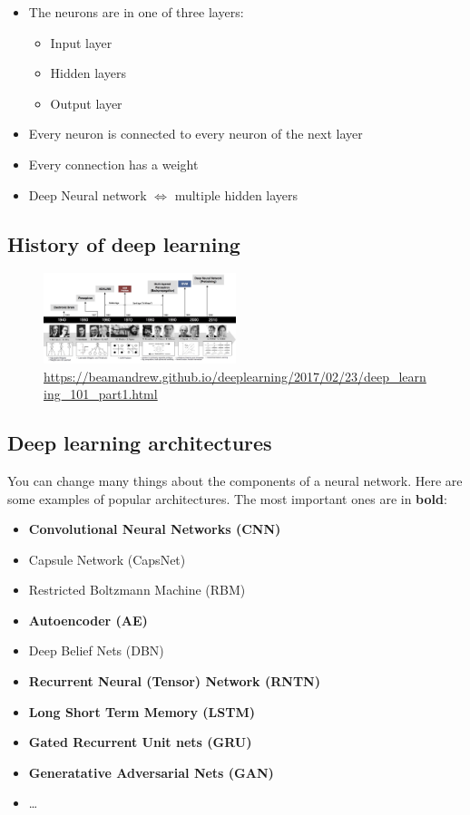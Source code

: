 \documentclass{article}
\begin{document}
\begin{itemize}
    \item The neurons are in one of three layers:
    \begin{itemize}
        \item Input layer
        \item Hidden layers
        \item Output layer
    \end{itemize}
    \item Every neuron is connected to every neuron of the next layer
    \item Every connection has a weight
    \item Deep Neural network $\Leftrightarrow$ multiple hidden layers
\end{itemize}

\subsection{History of deep learning}

\begin{figure}[H]
    \centering
    \includegraphics[width=0.5\textwidth]{deep-learning-history.png}
    \caption{\url{https://beamandrew.github.io/deeplearning/2017/02/23/deep_learning_101_part1.html}}
\end{figure}


\subsection{Deep learning architectures}

You can change many things about the components of a neural network. 
Here are some examples of popular architectures. The most important ones are in \textbf{bold}:

\begin{itemize}
    \item \textbf{Convolutional Neural Networks (CNN)}
    \item Capsule Network (CapsNet)
    \item Restricted Boltzmann Machine (RBM)
    \item \textbf{Autoencoder (AE)}
    \item Deep Belief Nets (DBN)
    \item \textbf{Recurrent Neural (Tensor) Network (RNTN)}
    \item \textbf{Long Short Term Memory (LSTM)}
    \item \textbf{Gated Recurrent Unit nets (GRU)}
    \item \textbf{Generatative Adversarial Nets (GAN)}
    \item \dots
\end{itemize}
\end{document}
